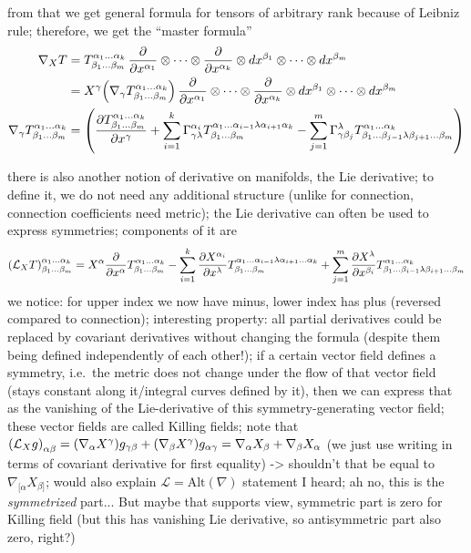 from that we get general formula for tensors of arbitrary rank because of Leibniz rule; therefore, we get the \enquote{master formula}
\begin{align}
\nabla_X T &= T^{\alpha_1 \dots \alpha_k}_{\beta_1 \dots \beta_m} \, \pdv{x^{\alpha_1}} \otimes \dots \otimes \pdv{x^{\alpha_k}} \otimes dx^{\beta_1} \otimes \dots \otimes dx^{\beta_m}
\notag\\
&= X^\gamma \qty(\nabla_\gamma T^{\alpha_1 \dots \alpha_k}_{\beta_1 \dots \beta_m}) \, \pdv{x^{\alpha_1}} \otimes \dots \otimes \pdv{x^{\alpha_k}} \otimes dx^{\beta_1} \otimes \dots \otimes dx^{\beta_m}
\notag\\
\nabla_\gamma T^{\alpha_1 \dots \alpha_k}_{\beta_1 \dots \beta_m} &= \qty(\pdv{T^{\alpha_1 \dots \alpha_k}_{\beta_1 \dots \beta_m}}{x^\gamma} + \sum_{i = 1}^k \Gamma_{\gamma \lambda}^{\alpha_i} T^{\alpha_1 \dots \alpha_{i - 1} \lambda \alpha_{i + 1} \alpha_k}_{\beta_1 \dots \beta_m} - \sum_{j = 1}^m \Gamma_{\gamma \beta_j}^\lambda T^{\alpha_1 \dots \alpha_k}_{\beta_1 \dots \beta_{j - 1} \lambda \beta_{j + 1} \dots \beta_m})
\end{align}


there is also another notion of derivative on manifolds, the Lie derivative; to define it, we do not need any additional structure (unlike for connection, connection coefficients need metric); the Lie derivative can often be used to express symmetries; components of it are
\begin{equation}
\qty(\mathcal{L}_X T)^{\alpha_1 \dots \alpha_k}_{\beta_1 \dots \beta_m} = X^\alpha \pdv{x^\alpha} T^{\alpha_1 \dots \alpha_k}_{\beta_1 \dots \beta_m} - \sum_{i = 1}^k \pdv{X^{\alpha_i}}{x^\lambda} T^{\alpha_1 \dots \alpha_{i - 1} \lambda \alpha_{i + 1} \dots \alpha_k}_{\beta_1 \dots \beta_m} + \sum_{j = 1}^m \pdv{X^\lambda}{x^{\beta_i}} T^{\alpha_1 \dots \alpha_k}_{\beta_1 \dots \beta_{i - 1} \lambda \beta_{i + 1} \dots \beta_m}
\end{equation}
we notice: for upper index we now have minus, lower index has plus (reversed compared to connection); interesting property: all partial derivatives could be replaced by covariant derivatives without changing the formula (despite them being defined independently of each other!); if a certain vector field defines a symmetry, i.e.~the metric does not change under the flow of that vector field (stays constant along it/integral curves defined by it), then we can express that as the vanishing of the Lie-derivative of this symmetry-generating vector field; these vector fields are called Killing fields; note that $\qty(\mathcal{L}_X g)_{\alpha \beta} = \qty(\nabla_\alpha X^\gamma) g_{\gamma \beta} + \qty(\nabla_\beta X^\gamma) g_{\alpha \gamma} = \nabla_\alpha X_\beta + \nabla_\beta X_\alpha$ (we just use writing in terms of covariant derivative for first equality) -> shouldn't that be equal to $\nabla_{[\alpha} X_{\beta]}$; would also explain $\mathcal{L} = \text{Alt}(\nabla)$ statement I heard; ah no, this is the \emph{symmetrized} part... But maybe that supports view, symmetric part is zero for Killing field (but this has vanishing Lie derivative, so antisymmetric part also zero, right?)



